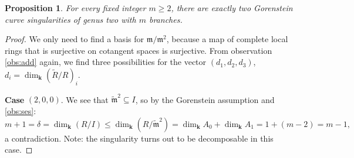 \documentclass[11pt]{amsart}
\renewcommand{\k}{\mathbf k}
\newcommand{\m}{\mathfrak m}
\newcommand{\tR}{\widetilde{R}}
\newcommand{\tm}{\widetilde{\mathfrak m}}
\theoremstyle{plain}
\newtheorem{prop}[thm]{Proposition}
\theoremstyle{definition}
\begin{document}
\begin{prop}\label{prop:classification}
 For every fixed integer $m\geq 2$, there are exactly two Gorenstein curve singularities of genus two with $m$ branches.
\end{prop}
\begin{proof}
 We only need to find a basis for $\m/\m^2$, because a map of complete local rings that is surjective on cotangent spaces is surjective. From observation \eqref{obs:add} again, we find three possibilities for the vector $(d_1,d_2,d_3)$, $d_i=\dim_{\k}(\tR/R)_i$.
 
 \smallskip
 
 \textbf{Case} $(2,0,0)$. We see that $\tm^2\subseteq I$, so by the Gorenstein assumption and \eqref{obs:ses}: \[m+1=\delta=\dim_\k(R/I)\leq \dim_\k(R/\tm^2)=\dim_\k A_0+\dim_\k A_1=1+(m-2)=m-1,\] a contradiction. Note: the singularity turns out to be decomposable in this case.
 
 \smallskip
 

\end{proof}
\end{document}
